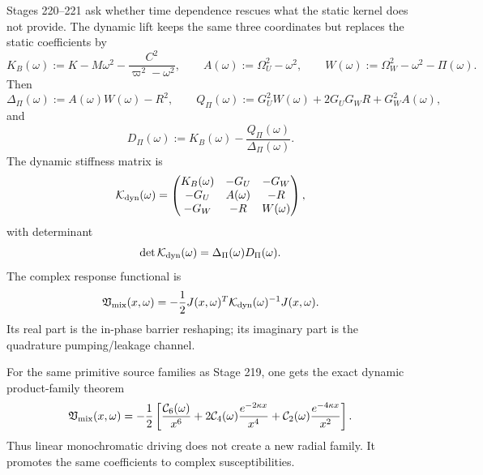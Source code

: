 Stages 220--221 ask whether time dependence rescues what the static kernel does not provide.  The dynamic lift keeps the same three coordinates but replaces the static coefficients by
\begin{equation}
\label{eq:app-part07-dyn-coefficients}
K_B(\omega):=K-M\omega^2-\frac{C^2}{\varpi^2-\omega^2},
\qquad
A(\omega):=\Omega_U^2-\omega^2,
\qquad
W(\omega):=\Omega_W^2-\omega^2-\Pi(\omega).
\end{equation}
Then
\begin{equation}
\label{eq:app-part07-dyn-delta-q-d}
\Delta_\Pi(\omega):=A(\omega)W(\omega)-R^2,
\qquad
Q_\Pi(\omega):=G_U^2W(\omega)+2G_UG_WR+G_W^2A(\omega),
\end{equation}
and
\begin{equation}
\label{eq:app-part07-dyn-dpi}
D_\Pi(\omega):=K_B(\omega)-\frac{Q_\Pi(\omega)}{\Delta_\Pi(\omega)}.
\end{equation}
The dynamic stiffness matrix is
\begin{equation}
\label{eq:app-part07-dyn-kmatrix}
\mathcal K_{\rm dyn}(\omega)=
\begin{pmatrix}
K_B(\omega) & -G_U & -G_W \\
-G_U & A(\omega) & -R \\
-G_W & -R & W(\omega)
\end{pmatrix},
\end{equation}
with determinant
\begin{equation}
\label{eq:app-part07-dyn-det}
\det\mathcal K_{\rm dyn}(\omega)=\Delta_\Pi(\omega)D_\Pi(\omega).
\end{equation}
The complex response functional is
\begin{equation}
\label{eq:app-part07-dyn-vmix}
\mathfrak V_{\rm mix}(x,\omega)
=-\frac12J(x,\omega)^T\mathcal K_{\rm dyn}(\omega)^{-1}J(x,\omega).
\end{equation}
Its real part is the in-phase barrier reshaping; its imaginary part is the quadrature pumping/leakage channel.

For the same primitive source families as Stage 219, one gets the exact dynamic product-family theorem
\begin{equation}
\label{eq:app-part07-dyn-product-family}
\mathfrak V_{\rm mix}(x,\omega)
=-\frac12\left[
\frac{\mathcal C_6(\omega)}{x^6}
+2\mathcal C_4(\omega)\frac{e^{-2\kappa x}}{x^4}
+\mathcal C_2(\omega)\frac{e^{-4\kappa x}}{x^2}
\right].
\end{equation}
Thus linear monochromatic driving does not create a new radial family.  It promotes the same coefficients to complex susceptibilities.

